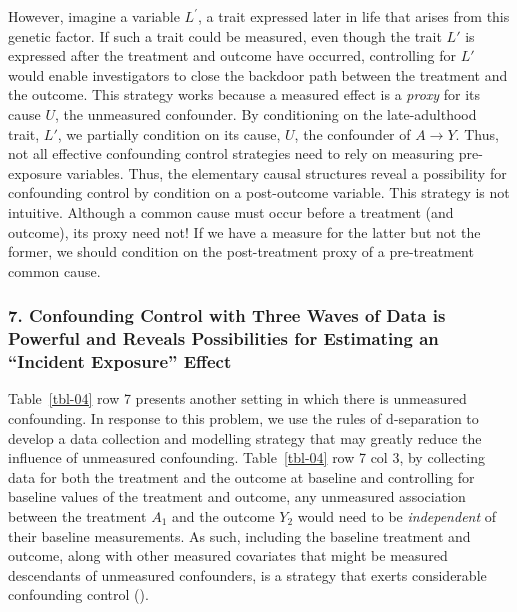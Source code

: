 \documentclass[
  singlecolumn]{article}
\begin{document}
However, imagine a variable \(L^\prime\), a trait expressed later in
life that arises from this genetic factor. If such a trait could be
measured, even though the trait \(L'\) is expressed after the treatment
and outcome have occurred, controlling for \(L'\) would enable
investigators to close the backdoor path between the treatment and the
outcome. This strategy works because a measured effect is a \emph{proxy}
for its cause \(U\), the unmeasured confounder. By conditioning on the
late-adulthood trait, \(L'\), we partially condition on its cause,
\(U\), the confounder of \(A \to Y\). Thus, not all effective
confounding control strategies need to rely on measuring pre-exposure
variables. Thus, the elementary causal structures reveal a possibility
for confounding control by condition on a post-outcome variable. This
strategy is not intuitive. Although a common cause must occur before a
treatment (and outcome), its proxy need not! If we have a measure for
the latter but not the former, we should condition on the post-treatment
proxy of a pre-treatment common cause.

\subsubsection{7. Confounding Control with Three Waves of Data is
Powerful and Reveals Possibilities for Estimating an ``Incident
Exposure''
Effect}\label{confounding-control-with-three-waves-of-data-is-powerful-and-reveals-possibilities-for-estimating-an-incident-exposure-effect}

Table~\ref{tbl-04} row 7 presents another setting in which there is
unmeasured confounding. In response to this problem, we use the rules of
d-separation to develop a data collection and modelling strategy that
may greatly reduce the influence of unmeasured confounding.
Table~\ref{tbl-04} row 7 col 3, by collecting data for both the
treatment and the outcome at baseline and controlling for baseline
values of the treatment and outcome, any unmeasured association between
the treatment \(A_1\) and the outcome \(Y_2\) would need to be
\emph{independent} of their baseline measurements. As such, including
the baseline treatment and outcome, along with other measured covariates
that might be measured descendants of unmeasured confounders, is a
strategy that exerts considerable confounding control
().
\end{document}
